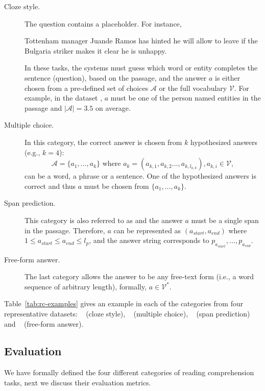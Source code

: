 \begin{description}
\item[Cloze style.] The question contains a placeholder. For instance,
\begin{displayquote}
Tottenham manager Juande Ramos has hinted he will allow \underline{\hspace{1cm}} to leave if the Bulgaria striker makes it clear he is unhappy.
\end{displayquote}
In these tasks, the systems must guess which word or entity completes the sentence (question), based on the passage, and the answer ${a}$ is either chosen from a pre-defined set of choices $\mathcal{A}$ or the full vocabulary $\mathcal{V}$. For example, in the  dataset \cite{onishi2016did}, ${a}$ must be one of the person named entities in the passage and $|\mathcal{A}| = 3.5$ on average.

\item[Multiple choice.] In this category, the correct answer is chosen from $k$ hypothesized answers (e.g., $k = 4$):
$$\mathcal{A} = \{{a}_1, \ldots, {a}_k\}  \text{ where } {a}_{k} = (a_{k, 1}, a_{k, 2} \ldots, a_{k, l_{a, k}}), a_{k, i} \in \mathcal{V},$$
can be a word, a phrase or a sentence. One of the hypothesized answers is correct and thus ${a}$ must be chosen from $\{{a}_1, \ldots, {a}_k\}$.


\item[Span prediction.] This category is also referred to as  and the answer ${a}$ must be a single span in the passage. Therefore, ${a}$ can be represented as $(a_{start}, a_{end})$ where $1 \leq a_{start} \leq a_{end} \leq l_p$, and the answer string corresponds to $p_{a_{start}}, \ldots, p_{a_{end}}.$

\item[Free-form answer.] The last category allows the answer to be any free-text form (i.e., a word sequence of arbitrary length), formally, ${a} \in \mathcal{V}^*$.
\end{description}

Table~\ref{tab:rc-examples} gives an example in each of the categories from four representative datasets: ~\cite{hermann2015teaching} (cloze style), ~\cite{richardson2013mctest} (multiple choice), ~\cite{rajpurkar2016squad} (span prediction) and ~\cite{kovcisky2018narrativeqa} (free-form answer).


\subsection{Evaluation}
\label{sec:evaluation}
We have formally defined the four different categories of reading comprehension tasks, next we discuss their evaluation metrics.

